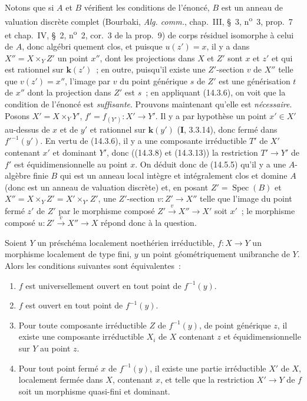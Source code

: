 Notons que si $A$ et $B$ vérifient les conditions de l'énoncé, $B$ est un anneau
de valuation discrète complet (Bourbaki, \emph{Alg. comm.}, chap.~III, \S~3,
n\textsuperscript{o}~3, prop.~7 et chap.~IV, \S~2, n\textsuperscript{o}~2,
cor.~3 de la prop.~9) de corps résiduel isomorphe à celui de $A$, donc
algébri%
quement clos, et puisque $u(z')=x$, il y a dans $X''=X\times_Y Z'$ un point
$x''$, dont les projections dans $X$ et $Z'$ sont $x$ et $z'$ et qui est rationnel
sur $\boldsymbol{k}(z')$~; en outre, puisqu'il existe une $Z'$-section $v$ de $X''$ telle que
$v(z')=x''$, l'image par $v$ du point générique $s$ de $Z'$ est une générisation
$t$ de $x''$ dont la projection dans $Z'$ est $s$~; en appliquant (14.3.6), on voit
que la condition de l'énoncé est \emph{suffisante}. Prouvons maintenant qu'elle est
\emph{nécessaire}. Posons $X'=X\times_Y Y'$, $f'=f_{(Y')}:X'\to Y'$. Il y a par
hypothèse un point $x'\in X'$ au-dessus de $x$ et de $y'$ et rationnel sur $\boldsymbol{k}(y')$
(\textbf{I}, 3.3.14), donc fermé dans $f'^{-1}(y')$. En vertu de (14.3.6), il y a
une composante irréductible $T'$ de $X'$ contenant $x'$ et dominant $Y'$, donc
((14.3.8) et (14.3.13)) la restriction $T'\to Y'$ de $f'$ est équidimensionnelle au
point $x$. On déduit donc de (14.5.5) qu'il y a une $A$-algèbre finie $B$ qui est
un anneau local intègre et intégralement clos et domine $A$ (donc est un anneau de
valuation discrète) et, en posant $Z'=\operatorname{Spec}(B)$ et
$X''=X\times_Y Z'=X'\times_{Y'}Z'$, une $Z'$-section $v:Z'\to X''$ telle que
l'image du point fermé $z'$ de $Z'$ par le morphisme composé $Z'\xrightarrow{v}X''\to X'$ soit
$x'$~; le morphisme composé $u:Z'\xrightarrow{v}X''\to X$ répond donc à la question.

\begin{proposition}[14.5.9]
\label{IV.14.5.9-fr}
Soient $Y$ un préschéma localement noethérien irréductible, $f:X\to Y$ un
morphisme localement de type fini, $y$ un point \textup{géométriquement unibranche} de $Y$.
Alors les conditions suivantes sont équivalentes~:
\begin{enumerate}[label=\emph{\alph*)}]
  \item $f$ est universellement ouvert en tout point de $f^{-1}(y)$.
  \item $f$ est ouvert en tout point de $f^{-1}(y)$.
  \item Pour toute composante irréductible $Z$ de $f^{-1}(y)$, de point générique
  $z$, il existe une composante irréductible $X_i$ de $X$ contenant $z$ et
  équidimensionnelle sur $Y$ au point $z$.
  \item Pour tout point fermé $x$ de $f^{-1}(y)$, il existe une partie irréductible
  $X'$ de $X$, localement fermée dans $X$, contenant $x$, et telle que la
  restriction $X'\to Y$ de $f$ soit un morphisme quasi-fini et dominant.
\end{enumerate}
\end{proposition}

